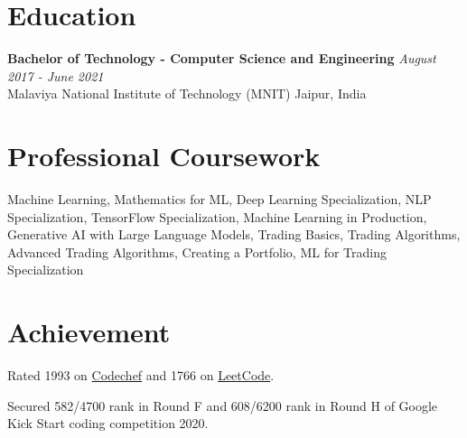 \documentclass[a4paper,20pt]{article}
\begin{document}
\vspace{1pt}
\section{Education}
\noindent\textbf{Bachelor of Technology - Computer Science and Engineering} \hfill \textit{August 2017 - June 2021}\\
Malaviya National Institute of Technology (MNIT) \hfill Jaipur, India

	
\vspace{1pt}
\section{Professional Coursework}
	Machine Learning, Mathematics for ML, Deep Learning Specialization, NLP Specialization, TensorFlow Specialization, Machine Learning in Production, Generative AI with Large Language Models, Trading Basics, Trading Algorithms, Advanced Trading Algorithms, Creating a Portfolio, ML for Trading Specialization

\vspace{1pt}
\section{Achievement}
\begin{description}[font=$\bullet$]
\item {Rated 1993 on \href{https://www.codechef.com/users/khimrajsuthar}{Codechef} and 1766 on \href{https://leetcode.com/khimrajsuthar/}{LeetCode}.}
\vspace{-4pt}
\item {Secured 582/4700 rank in Round F and 608/6200 rank in Round H of Google Kick Start coding competition 2020.}

\end{description}
\end{document}
